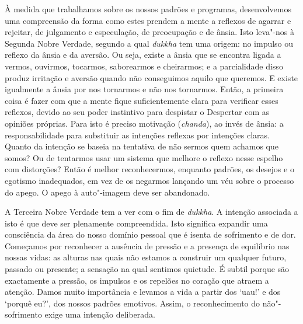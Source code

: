 À medida que trabalhamos sobre os nossos padrões e programas, desenvolvemos uma compreensão da forma como estes prendem a mente a reflexos de agarrar e rejeitar, de julgamento e especulação, de preocupação e de ânsia. Isto leva"-nos à Segunda Nobre Verdade, segundo a qual \emph{dukkha} tem uma origem: no impulso ou reflexo da ânsia e da aversão. Ou seja, existe a ânsia que se encontra ligada a vermos, ouvirmos, tocarmos, saborearmos e cheirarmos; e a parcialidade disso produz irritação e aversão quando não conseguimos aquilo que queremos. E existe igualmente a ânsia por nos tornarmos e não nos tornarmos. Então, a primeira coisa é fazer com que a mente fique suficientemente clara para verificar esses reflexos, devido ao seu poder instintivo para despistar o Despertar com as opiniões próprias. Para isto é preciso motivação (\emph{chanda}), ao invés de ânsia: a responsabilidade para substituir as intenções reflexas por intenções claras. Quanto da intenção se baseia na tentativa de não sermos quem achamos que somos? Ou de tentarmos usar um sistema que melhore o reflexo nesse espelho com distorções? Então é melhor reconhecermos, enquanto padrões, os desejos e o egotismo inadequados, em vez de os negarmos lançando um véu sobre o processo do apego. O apego à auto"-imagem deve ser abandonado.

A Terceira Nobre Verdade tem a ver com o fim de \emph{dukkha}. A intenção associada a isto é que deve ser plenamente compreendida. Isto significa expandir uma consciência da área do nosso domínio pessoal que é isenta de sofrimento e de dor. Começamos por reconhecer a ausência de pressão e a presença de equilíbrio nas nossas vidas: as alturas nas quais não estamos a construir um qualquer futuro, passado ou presente; a sensação na qual sentimos quietude. É subtil porque são exactamente a pressão, os impulsos e os repelões no coração que atraem a atenção. Damos muito importância e levamos a vida a partir dos `uau!' e dos `porquê eu?', dos nossos padrões emotivos. Assim, o reconhecimento do não"-sofrimento exige uma intenção deliberada.

